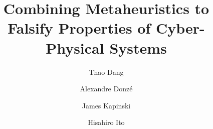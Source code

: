 \documentclass[twocolumn,9pt,sigconf]{acmart}
\title{Combining Metaheuristics to Falsify Properties of Cyber-Physical Systems}
\author{Thao Dang}
\affiliation{%
  \institution{CNRS/Verimag, France}
}
\author{Alexandre Donz{\'{e}}}
\affiliation{%
  \institution{Decyphir, France}
}
\author{James Kapinski}
\affiliation{%
  \institution{Toyota Research Institute - North America}
}
\author{Hisahiro Ito}
\affiliation{%
  \institution{Toyota Research Institute - North America}
}
\date{}
\begin{document}
\begin{abstract}

\end{abstract}

\maketitle


\iffalse
\begin{outline}[enumerate]
\1 Introduction
	\2 The challenge of falsification
	\2 Falsification generally and via STL for CPS
	\2 Coverage
	\2 Metaheuristics in optimization
	\2 Overview of our approach
\1 Preliminaries: \emph{For much of the notation, we can reuse the notation from the CAV paper with Arvind, as it provides a way to introduce STL, robustness, and falsification but then quickly move to a general global optimization setting.}
	\2 General notation
		\3 $\Pi$ is a set of global optimization solvers
		\3 For a given solver $\pi\in \Pi$, $\Theta$ is a set of solver \emph{configurations}
		\3 $J$ is a cost evaluation
		\3 $x(t)$ is a trace of the system
	\2 Falsification
	\2 STL
		\3 $\varphi$ is an STL property 
		\3 $\rho$ maps a trace and an STL formula to a real number
	\2 Coverage
		\3 $H$ takes a collection of points and maps it to a real number representing the \emph{coverage} of the space points.
\1 Method
	\2 Monitoring robustness and coverage across iterations
	\2 Changing solver based on heuristic rules, informed by robustness and coverage
	\2 F-Race for tuning parameters
\1 Experiments
\1 Conclusions
\end{outline}
\fi










 
\end{document}
